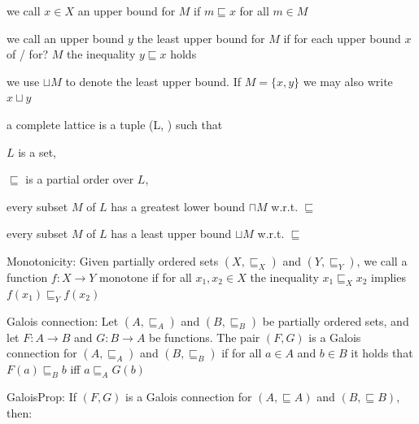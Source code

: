 \documentclass[landscape, a4paper]{article}
\begin{document}
\begin{minipage}[t]{0.2\linewidth}
\begin{betterlist}
\begin{betterlist}
\begin{betterlist}
			\end{betterlist}
			\item we call $x \in X$ an \alert{upper bound} for $M$ if $m \sqsubseteq x$ for all $m \in M$
			\item we call an upper bound $y$ the \alert{least upper bound} for $M$ if for each upper bound $x$ of / for? $M$ the inequality $y \sqsubseteq x$ holds
			\begin{betterlist}
				\item we use $\sqcup M$ to denote the \alert{least upper bound}. If $M = \{x, y\}$ we may also write $x \sqcup y$
			\end{betterlist}
		\end{betterlist}
		\item a \alert{complete lattice} is a tuple (L, \sqsubseteq ) such that
		\begin{betterlist}
			\item $L$ is a set,
			\item $\sqsubseteq $ is a \alert{partial order} over $L$,
			\item every subset $M$ of $L$ has a \alert{greatest lower bound} $\sqcap M$ w.r.t. $\sqsubseteq$
			\item every subset $M$ of $L$ has a \alert{least upper bound} $\sqcup M$ w.r.t. $\sqsubseteq$
			\item {}
		\end{betterlist}
		\item \alert{Monotonicity:} Given partially ordered sets $(X, \sqsubseteq_X)$ and $(Y, \sqsubseteq_Y)$, we call a function $f:X\rightarrow Y$ \alert{monotone} if for all $x_1, x_2 \in X$ the inequality $x_1 \sqsubseteq_X x_2$ implies $f(x_1) \sqsubseteq_Y f(x_2)$
		\begin{betterlist}
			\item \script{385}{Examples}
		\end{betterlist}
		\item \color{orange}\alert{Galois connection:} Let $(A, \sqsubseteq_A)$ and $(B, \sqsubseteq_B)$ be partially ordered sets, and let $F : A \rightarrow B$ and $G : B \rightarrow A$ be functions. The pair $(F, G)$ is a Galois connection for $(A, \sqsubseteq_A)$ and $(B, \sqsubseteq_B)$ if for all $a \in A$ and $b \in B$ it holds that $F(a) \sqsubseteq_B b$ iff $a \sqsubseteq_A G(b)$\color{black}
		\item \color{orange}\alert{GaloisProp:} If $(F, G)$ is a \alert{Galois connection} for $(A, \sqsubseteq A)$ and $(B, \sqsubseteq B)$, then:
		\begin{betterlist}

\end{betterlist}
\end{betterlist}
\end{minipage}
\end{document}
